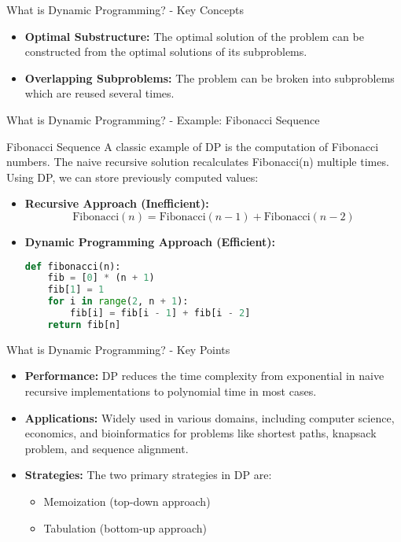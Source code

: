 \documentclass[aspectratio=169]{beamer}
\begin{document}
\begin{frame}[fragile]{What is Dynamic Programming? - Key Concepts}
    \begin{itemize}
        \item \textbf{Optimal Substructure:} The optimal solution of the problem can be constructed from the optimal solutions of its subproblems.
        \item \textbf{Overlapping Subproblems:} The problem can be broken into subproblems which are reused several times.
    \end{itemize}
\end{frame}

\begin{frame}[fragile]{What is Dynamic Programming? - Example: Fibonacci Sequence}
    \begin{block}{Fibonacci Sequence}
        A classic example of DP is the computation of Fibonacci numbers. The naive recursive solution recalculates Fibonacci(n) multiple times. Using DP, we can store previously computed values:
    \end{block}

    \begin{itemize}
        \item \textbf{Recursive Approach (Inefficient):}
        \begin{equation*}
            \text{Fibonacci}(n) = \text{Fibonacci}(n-1) + \text{Fibonacci}(n-2)
        \end{equation*}
        
        \item \textbf{Dynamic Programming Approach (Efficient):}
        \begin{lstlisting}[language=Python]
def fibonacci(n):
    fib = [0] * (n + 1)
    fib[1] = 1
    for i in range(2, n + 1):
        fib[i] = fib[i - 1] + fib[i - 2]
    return fib[n]
        \end{lstlisting}
    \end{itemize}
\end{frame}

\begin{frame}[fragile]{What is Dynamic Programming? - Key Points}
    \begin{itemize}
        \item \textbf{Performance:} DP reduces the time complexity from exponential in naive recursive implementations to polynomial time in most cases.
        \item \textbf{Applications:} Widely used in various domains, including computer science, economics, and bioinformatics for problems like shortest paths, knapsack problem, and sequence alignment.
        \item \textbf{Strategies:} The two primary strategies in DP are:
        \begin{itemize}
            \item Memoization (top-down approach)
            \item Tabulation (bottom-up approach)
        \end{itemize}
    \end{itemize}
\end{frame}
\end{document}
